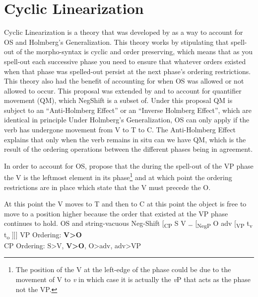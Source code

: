 \documentclass[12pt, letterpaper]{article}
\begin{document}
\section*{Cyclic Linearization} \label{sec:CL}

\ea Cyclic Linearization is a theory that was developed by \cite{foxCyclicLinearizationSyntactic2005} as a way to account for OS and Holmberg's Generalization.
\ex This theory works by stipulating that spell-out of the morpho-syntax is cyclic and order preserving, which means that as you spell-out each successive phase you need to ensure that whatever orders existed when that phase was spelled-out persist at the next phase's ordering restrictions. This theory also had the benefit of accounting for when OS was allowed or not allowed to occur. 
\ex This proposal was extended by \citet{foxCyclicLinearizationSyntactic2005} and \citet{engelsMicrovariationObjectPositions2011,engelsScandinavianNegativeIndefinites2012} to account for quantifier movement (QM), which NegShift is a subset of. 
\ex Under this proposal QM is subject to an ``Anti-Holmberg Effect'' or an ``Inverse Holmberg Effect'', which are identical in principle
	\ea Under Holmberg's Generalization, OS can only apply if the verb has undergone movement from V to T to C.
	\ex The Anti-Holmberg Effect explains that only when the verb remains in situ can we have QM, which is the result of the ordering operations between the different phases being in agreement. 
	\z
	\vspace{6pt} 

\ex In order to account for OS, \citeauthor{foxCyclicLinearizationSyntactic2005} propose that the during the spell-out of the VP phase the V is the leftmost element in its phase\footnote{The position of the V at the left-edge of the phase could be due to the movement of V to \textit{v} in which case it is actually the \textit{v}P that acts as the phase not the VP.} and at which point the ordering restrictions are in place which state that the V must precede the O. 

\ex At this point the V moves to T and then to C at this point the object is free to move to a position higher because the order that existed at the VP phase continues to hold. 
\ex OS and string-vacuous Neg-Shift
\vspace{6pt}
 	\ea {}[\textsubscript{CP} S V … [\textsubscript{NegP} O adv [\textsubscript{VP} t\textsubscript{v} t\textsubscript{o} ]]]
	\vspace{6pt}
	\ex VP Ordering: \textbf{V>O}\\
		CP Ordering: S>V, \textbf{V>O}, O>adv, adv>VP
	\z
\end{document}
